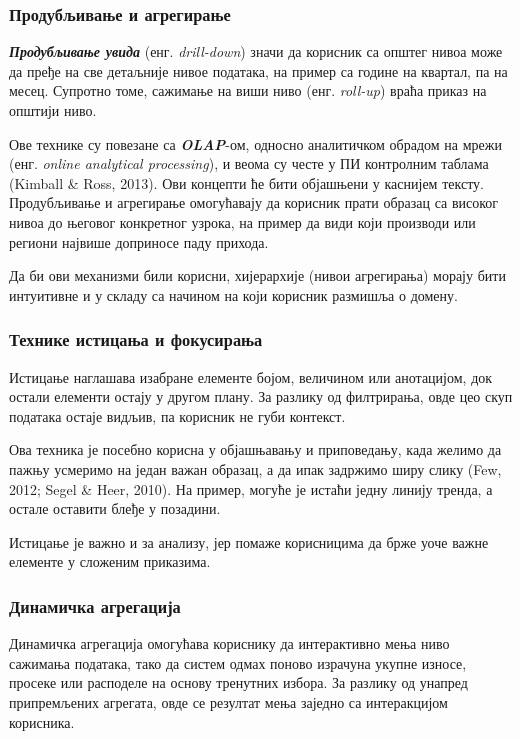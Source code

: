 \subsubsection{Продубљивање и агрегирање}
\textbf{\textit{Продубљивање увида}} (енг. \textit{drill-down}) значи да корисник са општег нивоа може да пређе на све детаљније нивое података, на пример са године на квартал, па на месец. Супротно томе, сажимање на виши ниво (енг. \textit{roll-up}) враћа приказ на општији ниво.

Ове технике су повезане са \textbf{\textit{OLAP}}-ом, односно аналитичком обрадом на мрежи (енг. \textit{online analytical processing}), и веома су честе у ПИ контролним таблама (Kimball \& Ross, 2013). Ови концепти ће бити објашњени у каснијем тексту. Продубљивање и агрегирање омогућавају да корисник прати образац са високог нивоа до његовог конкретног узрока, на пример да види који производи или региони највише доприносе паду прихода.

Да би ови механизми били корисни, хијерархије (нивои агрегирања) морају бити интуитивне и у складу са начином на који корисник размишља о домену.

\subsubsection{Технике истицања и фокусирања}
Истицање наглашава изабране елементе бојом, величином или анотацијом, док остали елементи остају у другом плану. За разлику од филтрирања, овде цео скуп података остаје видљив, па корисник не губи контекст.

Ова техника је посебно корисна у објашњавању и приповедању, када желимо да пажњу усмеримо на један важан образац, а да ипак задржимо ширу слику (Few, 2012; Segel \& Heer, 2010). На пример, могуће је истаћи једну линију тренда, а остале оставити блеђе у позадини.

Истицање је важно и за анализу, јер помаже корисницима да брже уоче важне елементе у сложеним приказима.

\subsubsection{Динамичка агрегација}
Динамичка агрегација омогућава кориснику да интерактивно мења ниво сажимања података, тако да систем одмах поново израчуна укупне износе, просеке или расподеле на основу тренутних избора. За разлику од унапред припремљених агрегата, овде се резултат мења заједно са интеракцијом корисника.

